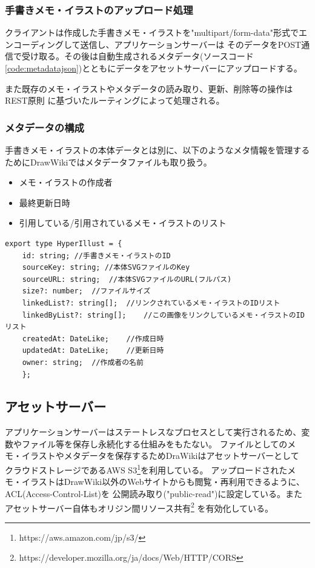 \subsubsection{手書きメモ・イラストのアップロード処理}
クライアントは作成した手書きメモ・イラストを"multipart/form-data"形式でエンコーディングして送信し、アプリケーションサーバーは
そのデータをPOST通信で受け取る。その後は自動生成されるメタデータ(ソースコード\ref{code:metadatajson})とともにデータをアセットサーバーにアップロードする。

また既存のメモ・イラストやメタデータの読み取り、更新、削除等の操作はREST原則\cite{Fielding2000ArchitecturalSA}
に基づいたルーティングによって処理される。

\subsubsection{メタデータの構成}
手書きメモ・イラストの本体データとは別に、以下のようなメタ情報を管理するためにDrawWikiではメタデータファイルも取り扱う。
\begin{itemize}
    \item メモ・イラストの作成者
    \item 最終更新日時
    \item 引用している/引用されているメモ・イラストのリスト
\end{itemize}

\begin{lstlisting}[caption=メタデータの概要, label=code:metadatajson]
    export type HyperIllust = {
    id: string; //手書きメモ・イラストのID
    sourceKey: string; //本体SVGファイルのKey
    sourceURL: string;  //本体SVGファイルのURL(フルパス)
    size?: number;  //ファイルサイズ
    linkedList?: string[];  //リンクされているメモ・イラストのIDリスト
    linkedByList?: string[];    //この画像をリンクしているメモ・イラストのIDリスト
    createdAt: DateLike;    //作成日時
    updatedAt: DateLike;    //更新日時
    owner: string;  //作成者の名前
    };
\end{lstlisting}

\subsection{アセットサーバー}
アプリケーションサーバーはステートレスなプロセスとして実行されるため、変数やファイル等を保存し永続化する仕組みをもたない。
ファイルとしてのメモ・イラストやメタデータを保存するためDraWikiはアセットサーバーとして
クラウドストレージであるAWS S3\footnote{https://aws.amazon.com/jp/s3/}を利用している。
アップロードされたメモ・イラストはDrawWiki以外のWebサイトからも閲覧・再利用できるように、ACL(Access-Control-List)を
公開読み取り("public-read")に設定している。またアセットサーバー自体もオリジン間リソース共有\footnote{https://developer.mozilla.org/ja/docs/Web/HTTP/CORS}
を有効化している。
